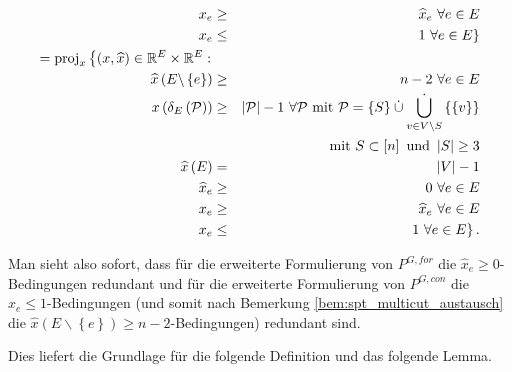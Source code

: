 \documentclass[10p,a4paper,BCOR = 12mm, DIV=15]{scrbook}
\begin{document}
\begin{eqnarray*}
x_e & \geq & \widehat{x}_e\ \forall e \in E \\
x_e & \leq & \left.1\ \forall e \in E\right\} \\
= \operatorname{proj}_x \left\{\left(x, \widehat{x}\right) \in \mathbb{R}^E \times \mathbb{R}^E: \right. & & \nonumber \\
\widehat{x}\left(E \backslash \left\{e\right\}\right) & \geq & n-2 \ \forall e \in E \\
x\left(\delta_E\left(\mathcal{P}\right)\right) & \geq & \left|\mathcal{P}\right|-1\ \forall \mathcal{P} \textnormal{ mit } \mathcal{P} = \left\{S\right\} \mathbin{\dot{\cup}} \mathop{\dot{\bigcup}}_{v \in V \backslash S} \left\{\left\{v\right\}\right\} \\
& & \textnormal{ mit } S \subset \left[n\right] \textnormal{ und } \left|S\right| \geq 3 \\
\widehat{x}\left(E\right) & = & \left|V\right|-1 \nonumber \\
\widehat{x}_e & \geq & 0\ \forall e \in E \\
x_e & \geq & \widehat{x}_e\ \forall e \in E \\
x_e & \leq & \left.1\ \forall e \in E\right\}.
\end{eqnarray*}

Man sieht also sofort, dass für die erweiterte Formulierung von $P^{G, for}$ die $\widehat{x}_e \geq 0$-Bedingungen redundant und für die erweiterte Formulierung von $P^{G, con}$ die $\widehat{x}_e \leq 1$-Bedingungen (und somit nach Bemerkung \ref{bem:spt_multicut_austausch} die $\widehat{x}\left(E \backslash \left\{e\right\}\right) \geq n-2$-Bedingungen) redundant sind.

Dies liefert die Grundlage für die folgende Definition und das folgende Lemma.
\end{document}
